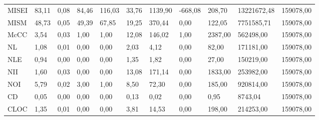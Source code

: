 \begin{table}[H]
{\begin{tabular}{@{}lp{10mm}p{10mm}p{10mm}p{10mm}llllll@{}}
MISEI                               & 83,11          & 0,08                    & 84,46            & 116,03        & 33,76                          & 1139,90                           & -668,08         & 208,70          & 13221672,48    & 159078,00       \\
MISM                                & 48,73          & 0,05                    & 49,39            & 67,85         & 19,25                          & 370,44                            & 0,00            & 122,05          & 7751585,71     & 159078,00       \\
McCC                                & 3,54           & 0,03                    & 1,00             & 1,00          & 12,08                          & 146,02                            & 1,00            & 2387,00         & 562498,00      & 159078,00       \\
NL                                  & 1,08           & 0,01                    & 0,00             & 0,00          & 2,03                           & 4,12                              & 0,00            & 82,00           & 171181,00      & 159078,00       \\
NLE                                 & 0,94           & 0,00                    & 0,00             & 0,00          & 1,35                           & 1,82                              & 0,00            & 27,00           & 150219,00      & 159078,00       \\
NII                                 & 1,60           & 0,03                    & 0,00             & 0,00          & 13,08                          & 171,14                            & 0,00            & 1833,00         & 253982,00      & 159078,00       \\
NOI                                 & 5,79           & 0,02                    & 3,00             & 1,00          & 8,50                           & 72,30                             & 0,00            & 185,00          & 920814,00      & 159078,00       \\
CD                                  & 0,05           & 0,00                    & 0,00             & 0,00          & 0,13                           & 0,02                              & 0,00            & 0,95            & 8743,04        & 159078,00       \\
CLOC                                & 1,35           & 0,01                    & 0,00             & 0,00          & 3,81                           & 14,53                             & 0,00            & 198,00          & 214253,00      & 159078,00       \\

\end{tabular}}
\end{table}
